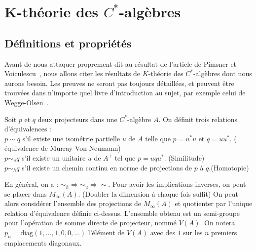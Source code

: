 \section{K-théorie des $C^*$-algèbres}

 
\subsection{Définitions et propriétés}
Avant de nous attaquer proprement dit au résultat de l'article de Pimsner et Voiculescu~\cite{PV}, nous allons citer les résultats de $K$-théorie des $C^*$-algèbres dont nous aurons besoin. Les preuves ne seront pas toujours détaillées, et peuvent être trouvées dans n'importe quel livre d'introduction au sujet, par exemple celui de Wegge-Olsen~\cite{WeggeOlsen}.\\

\begin{definition}
Soit $p$ et $q$ deux projecteurs dans une $C^*$-algèbre $A$. On définit trois relations d'équivalences :\\
$p\sim q$ s'il existe une isométrie partielle $u$ de $A$ telle que $p=u^*u $ et $q=uu^*$. ( équivalence de Murray-Von Neumann)\\
$p\sim_u q$ s'il existe un unitaire $u$ de $A^+$ tel que $p=uqu^*$. (Similitude)\\
$p\sim_h q$ s'il existe un chemin continu en norme de projections de $p$ à $q$.(Homotopie)\\
\end{definition}

En général, on a : $\sim_h \Rightarrow \sim_u \Rightarrow \sim$. Pour avoir les implications inverses, on peut se placer dans $M_\infty(A)$. (Doubler la dimension à chaque fois suffit) On peut alors considérer l'ensemble des projections de $M_\infty (A)$ et quotienter par l'unique relation d'équivalence définie ci-dessus. L'ensemble obtenu est un semi-groupe pour l'opération de somme directe de projecteur, nommé $V(A)$. On notera $p_n=\text{diag}(1,...,1,0,0,...)$ l'élément de $V(A)$ avec des $1$ sur les $n$ premiers emplacements diagonaux. \\

